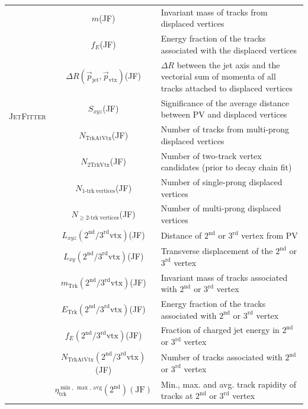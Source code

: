 \documentclass[10pt,a4paper]{book}
\begin{document}
\begin{table}[htbp]
\begin{center}
\begin{tabular}{|l|c|p{}|}
\hline
\multirow{8}{*}{\textsc{JetFitter}}
& $m$(JF) & Invariant mass of tracks from displaced vertices \\
& $f_E$(JF) &  Energy fraction of the tracks associated with the displaced vertices \\
& $\Delta R(\vec p_{\mathrm{jet}}, \vec p_{\mathrm{vtx}})$(JF) & $\Delta R$ between the jet axis and the vectorial sum of momenta of all tracks attached to displaced vertices \\
& $S_{xyz}$(JF) & Significance of the average distance between PV and displaced vertices \\
& $N_{{\mathrm{TrkAtVtx}}}$(JF) & Number of tracks from multi-prong displaced vertices \\
& $N_{{\mathrm{2TrkVtx}}}$(JF) & Number of two-track vertex candidates (prior to decay chain fit) \\
& $N_{{\mathrm {1\mbox{-}trk\ vertices}}}$(JF) & Number of single-prong displaced vertices \\
& $N_{{\geq \mathrm{2\mbox{-}trk\ vertices}}}$(JF) & Number of multi-prong displaced vertices \\
& $L_{xyz}(2^{{\mathrm{nd}}}/3^{{\mathrm{rd}}}{\mathrm{vtx}})$(JF) & Distance of $2^{{\mathrm{nd}}}$ or $3^{{\mathrm{rd}}}$ vertex from PV \\
& $L_{xy}(2^{{\mathrm{nd}}}/3^{{\mathrm{rd}}}{\mathrm{vtx}})$(JF) & Transverse displacement of the $2^{{\mathrm{nd}}}$ or $3^{{\mathrm{rd}}}$ vertex \\
& $m_{\mathrm{Trk}}(2^{{\mathrm{nd}}}/3^{{\mathrm{rd}}}{\mathrm{vtx}})$(JF) & Invariant mass of tracks associated with $2^{{\mathrm{nd}}}$ or $3^{{\mathrm{rd}}}$ vertex \\
& $E_{\mathrm{Trk}}(2^{{\mathrm{nd}}}/3^{{\mathrm{rd}}}{\mathrm{vtx}})$(JF) &  Energy fraction of the tracks associated with $2^{{\mathrm{nd}}}$ or $3^{{\mathrm{rd}}}$ vertex   \\
& $f_E (2^{{\mathrm{nd}}}/3^{{\mathrm{rd}}}{\mathrm{vtx}})$(JF) & Fraction of charged jet energy in $2^{{\mathrm{nd}}}$ or $3^{{\mathrm{rd}}}$ vertex\\
& $N_{{\mathrm{TrkAtVtx}}}(2^{{\mathrm{nd}}}/3^{{\mathrm{rd}}}{\mathrm{vtx}}) $(JF) & Number of tracks associated with $2^{{\mathrm{nd}}}$ or $3^{{\mathrm{rd}}}$ vertex \\
& $\eta_\text{trk}^{\min, \, \max, \, \text{avg}}(2^{\text{nd}})(\text{JF})$ & Min., max. and avg. track rapidity of tracks at $2^{{\mathrm{nd}}}$ or $3^{{\mathrm{rd}}}$ vertex \\
\hline
\end{tabular}
\end{center}
\end{table}
\end{document}
